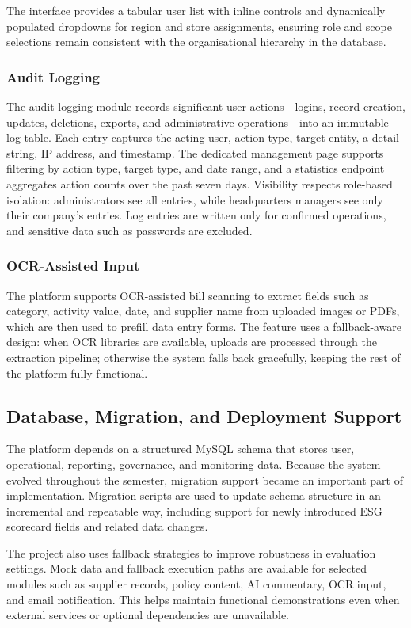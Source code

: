 \documentclass[11pt,a4paper]{article}
\begin{document}
The interface provides a tabular user list with inline controls and dynamically populated dropdowns for region and store assignments, ensuring role and scope selections remain consistent with the organisational hierarchy in the database.

\subsubsection{Audit Logging}
The audit logging module records significant user actions---logins, record creation, updates, deletions, exports, and administrative operations---into an immutable log table. Each entry captures the acting user, action type, target entity, a detail string, IP address, and timestamp. The dedicated management page supports filtering by action type, target type, and date range, and a statistics endpoint aggregates action counts over the past seven days. Visibility respects role-based isolation: administrators see all entries, while headquarters managers see only their company's entries. Log entries are written only for confirmed operations, and sensitive data such as passwords are excluded.

\subsubsection{OCR-Assisted Input}
The platform supports OCR-assisted bill scanning to extract fields such as category, activity value, date, and supplier name from uploaded images or PDFs, which are then used to prefill data entry forms. The feature uses a fallback-aware design: when OCR libraries are available, uploads are processed through the extraction pipeline; otherwise the system falls back gracefully, keeping the rest of the platform fully functional.

\subsection{Database, Migration, and Deployment Support}
The platform depends on a structured MySQL schema that stores user, operational, reporting, governance, and monitoring data. Because the system evolved throughout the semester, migration support became an important part of implementation. Migration scripts are used to update schema structure in an incremental and repeatable way, including support for newly introduced ESG scorecard fields and related data changes.

The project also uses fallback strategies to improve robustness in evaluation settings. Mock data and fallback execution paths are available for selected modules such as supplier records, policy content, AI commentary, OCR input, and email notification. This helps maintain functional demonstrations even when external services or optional dependencies are unavailable.
\end{document}
